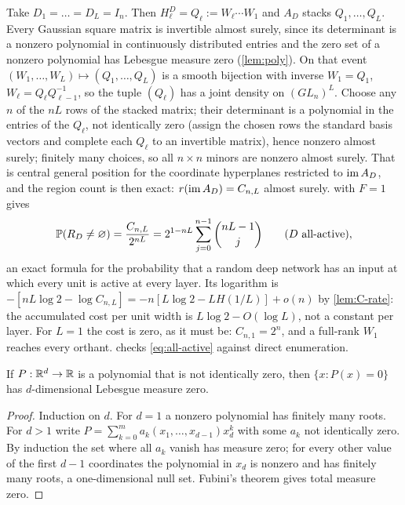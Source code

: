 Take $D_1=\dots=D_L=I_n$. Then $H^D_\ell=Q_\ell:=W_\ell\cdots W_1$ and $A_D$ stacks $Q_1,\dots,Q_L$. Every Gaussian square matrix is invertible almost surely, since its determinant is a nonzero polynomial in continuously distributed entries and the zero set of a nonzero polynomial has Lebesgue measure zero (\cref{lem:poly}). On that event $(W_1,\dots,W_L)\mapsto(Q_1,\dots,Q_L)$ is a smooth bijection with inverse $W_1=Q_1$, $W_\ell=Q_\ell Q_{\ell-1}^{-1}$, so the tuple $(Q_\ell)$ has a joint density on $(GL_n)^L$. Choose any $n$ of the $nL$ rows of the stacked matrix; their determinant is a polynomial in the entries of the $Q_\ell$, not identically zero (assign the chosen rows the standard basis vectors and complete each $Q_\ell$ to an invertible matrix), hence nonzero almost surely; finitely many choices, so all $n\times n$ minors are nonzero almost surely. That is central general position for the coordinate hyperplanes restricted to $\operatorname{im} A_D$, and the region count is then exact: $r(\operatorname{im} A_D)=C_{n,L}$ almost surely.  with $F=1$ gives
\begin{equation}\label{eq:all-active}
\mathbb{P}(R_D\ne\varnothing)=\frac{C_{n,L}}{2^{nL}}=2^{1-nL}\sum_{j=0}^{n-1}\binom{nL-1}j\qquad(D\text{ all-active}),
\end{equation}
an exact formula for the probability that a random deep network has an input at which every unit is active at every layer. Its logarithm is $-[nL\log2-\log C_{n,L}]=-n[L\log2-LH(1/L)]+o(n)$ by \cref{lem:C-rate}: the accumulated cost per unit width is $L\log2-O(\log L)$, not a constant per layer. For $L=1$ the cost is zero, as it must be: $C_{n,1}=2^n$, and a full-rank $W_1$ reaches every orthant.  checks \cref{eq:all-active} against direct enumeration.

\begin{lemma}\label{lem:poly}
If $P:\mathbb{R}^d\to\mathbb{R}$ is a polynomial that is not identically zero, then $\{x:P(x)=0\}$ has $d$-dimensional Lebesgue measure zero.
\end{lemma}

\begin{proof}
Induction on $d$. For $d=1$ a nonzero polynomial has finitely many roots. For $d>1$ write $P=\sum_{k=0}^ma_k(x_1,\dots,x_{d-1})x_d^k$ with some $a_k$ not identically zero. By induction the set where all $a_k$ vanish has measure zero; for every other value of the first $d-1$ coordinates the polynomial in $x_d$ is nonzero and has finitely many roots, a one-dimensional null set. Fubini's theorem gives total measure zero.
\end{proof}

